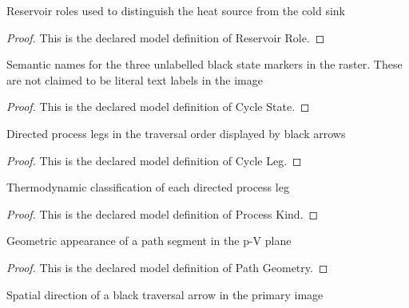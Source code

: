 \begin{definition}
  \label{def:physics:phyx-mini-0421:phyxminiproblems-problemphyxmini0421-reservoirrole}
  Reservoir roles used to distinguish the heat source from the cold sink
\end{definition}
\begin{proof}
  This is the declared model definition of Reservoir Role.
\end{proof}
\begin{definition}
  \label{def:physics:phyx-mini-0421:phyxminiproblems-problemphyxmini0421-cyclestate}
  Semantic names for the three unlabelled black state markers in the raster. These are not claimed to be literal text labels in the image
\end{definition}
\begin{proof}
  This is the declared model definition of Cycle State.
\end{proof}
\begin{definition}
  \label{def:physics:phyx-mini-0421:phyxminiproblems-problemphyxmini0421-cycleleg}
  Directed process legs in the traversal order displayed by black arrows
\end{definition}
\begin{proof}
  This is the declared model definition of Cycle Leg.
\end{proof}
\begin{definition}
  \label{def:physics:phyx-mini-0421:phyxminiproblems-problemphyxmini0421-processkind}
  Thermodynamic classification of each directed process leg
\end{definition}
\begin{proof}
  This is the declared model definition of Process Kind.
\end{proof}
\begin{definition}
  \label{def:physics:phyx-mini-0421:phyxminiproblems-problemphyxmini0421-pathgeometry}
  Geometric appearance of a path segment in the p-V plane
\end{definition}
\begin{proof}
  This is the declared model definition of Path Geometry.
\end{proof}
\begin{definition}
  \label{def:physics:phyx-mini-0421:phyxminiproblems-problemphyxmini0421-traversalarrowdirection}
  Spatial direction of a black traversal arrow in the primary image
\end{definition}
